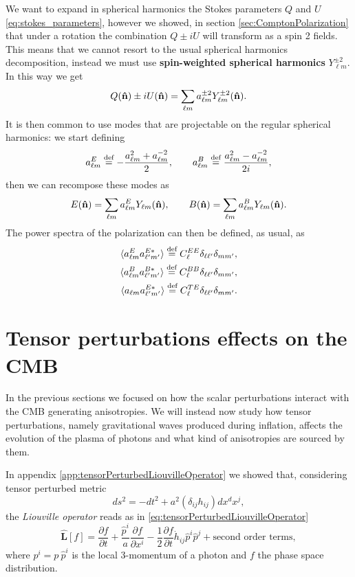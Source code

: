We want to expand in spherical harmonics the Stokes parameters $Q$ and $U$\eqref{eq:stokes_parameters}, however we showed, in section \ref{sec:ComptonPolarization} that under a rotation the combination $Q\pm iU$ will transform as a spin 2 fields. This means that we cannot resort to the usual spherical harmonics decomposition, instead we must use \textbf{spin-weighted spherical harmonics} $Y_{\ell m}^{\pm2}$. In this way we get 
$$Q(\mathbf{\hat{n}})\pm iU(\mathbf{\hat{n}}) = \sum_{\ell m}a_{\ell m}^{\pm 2}Y_{\ell m}^{\pm2}(\mathbf{\hat{n}}).$$
It is then common to use modes that are projectable on the regular spherical harmonics: we start defining
$$a^E_{\ell m}\stackrel{\text{def}}{=}-\frac{a^2_{\ell m}+a^{-2}_{\ell m}}{2},\qquad a^B_{\ell m}\stackrel{\text{def}}{=}\frac{a^2_{\ell m}-a^{-2}_{\ell m}}{2i},$$
then we can recompose these modes as
\begin{equation}\label{eq:EBmodes}
    E(\mathbf{\hat{n}})=\sum_{\ell m}a^E_{\ell m}Y_{\ell m}(\mathbf{\hat{n}}),\qquad B(\mathbf{\hat{n}})=\sum_{\ell m}a^B_{\ell m}Y_{\ell m}(\mathbf{\hat{n}}).
\end{equation}
The power spectra of the polarization can then be defined, as usual, as
\begin{align}\label{eq:PolPowerSpectrum}
    \langle a^E_{\ell m}a^{E*}_{\ell' m'}\rangle\stackrel{\text{def}}{=} C_{\ell}^{EE}\delta_{\ell \ell'}\delta_{m m'},\\ \langle a^B_{\ell m}a^{B*}_{\ell' m'}\rangle\stackrel{\text{def}}{=} C_{\ell}^{BB}\delta_{\ell \ell'}\delta_{m m'},\\\langle a_{\ell m}a^{E*}_{\ell' m'}\rangle\stackrel{\text{def}}{=} C_{\ell}^{TE}\delta_{\ell \ell'}\delta_{m m'}.
\end{align}
\section{Tensor perturbations effects on the CMB}\label{sec:Anisotropies_From_Tensor}
In the previous sections we focused on how the scalar perturbations interact with the CMB generating anisotropies. We will instead now study how tensor perturbations, namely gravitational waves produced during inflation, affects the evolution of the plasma of photons and what kind of anisotropies are sourced by them.

In appendix \ref{app:tensorPerturbedLiouvilleOperator} we showed that, considering tensor perturbed metric $$ds^2=-dt^2+a^2(\delta_{ij}h_{ij})dx^dx^j,$$the \emph{Liouville operator} reads as in \eqref{eq:tensorPerturbedLiouvilleOperator}
$$\hat{\mathbf{L}}[f]=\frac{\partial f}{\partial t}+\frac{\hat p^i}{a}\frac{\partial f}{\partial x^i}-\frac{1}{2}\frac{\partial f}{\partial t}\dot{h}_{ij}\hat p^i\hat p^j+\text{second order terms},$$
where $p^i=p\ \hat p^i$ is the local 3-momentum of a photon and $f$ the phase space distribution.

